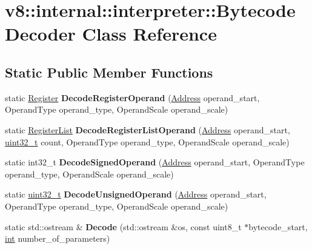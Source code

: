 \hypertarget{classv8_1_1internal_1_1interpreter_1_1BytecodeDecoder}{}\section{v8\+:\+:internal\+:\+:interpreter\+:\+:Bytecode\+Decoder Class Reference}
\label{classv8_1_1internal_1_1interpreter_1_1BytecodeDecoder}
\subsection*{Static Public Member Functions}
\begin{DoxyCompactItemize}
\item 
\mbox{\label{classv8_1_1internal_1_1interpreter_1_1BytecodeDecoder_ae6898ac65e67590041d7a368a952f167}} 
static \mbox{\hyperlink{classv8_1_1internal_1_1interpreter_1_1Register}{Register}} {\bfseries Decode\+Register\+Operand} (\mbox{\hyperlink{classuintptr__t}{Address}} operand\+\_\+start, Operand\+Type operand\+\_\+type, Operand\+Scale operand\+\_\+scale)
\item 
\mbox{\label{classv8_1_1internal_1_1interpreter_1_1BytecodeDecoder_a6847328e2bbccba309ab2b2ab24c4703}} 
static \mbox{\hyperlink{classv8_1_1internal_1_1interpreter_1_1RegisterList}{Register\+List}} {\bfseries Decode\+Register\+List\+Operand} (\mbox{\hyperlink{classuintptr__t}{Address}} operand\+\_\+start, \mbox{\hyperlink{classuint32__t}{uint32\+\_\+t}} count, Operand\+Type operand\+\_\+type, Operand\+Scale operand\+\_\+scale)
\item 
\mbox{\label{classv8_1_1internal_1_1interpreter_1_1BytecodeDecoder_a5ac4e9d4db2cc579313309234cd789d8}} 
static int32\+\_\+t {\bfseries Decode\+Signed\+Operand} (\mbox{\hyperlink{classuintptr__t}{Address}} operand\+\_\+start, Operand\+Type operand\+\_\+type, Operand\+Scale operand\+\_\+scale)
\item 
\mbox{\label{classv8_1_1internal_1_1interpreter_1_1BytecodeDecoder_ae2edbb0761fd863bd54238eb7b599f5a}} 
static \mbox{\hyperlink{classuint32__t}{uint32\+\_\+t}} {\bfseries Decode\+Unsigned\+Operand} (\mbox{\hyperlink{classuintptr__t}{Address}} operand\+\_\+start, Operand\+Type operand\+\_\+type, Operand\+Scale operand\+\_\+scale)
\item 
\mbox{\label{classv8_1_1internal_1_1interpreter_1_1BytecodeDecoder_a576068c1a75d20e39c27dae73e5abbd9}} 
static std\+::ostream \& {\bfseries Decode} (std\+::ostream \&os, const uint8\+\_\+t $\ast$bytecode\+\_\+start, \mbox{\hyperlink{classint}{int}} number\+\_\+of\+\_\+parameters)
\end{DoxyCompactItemize}


